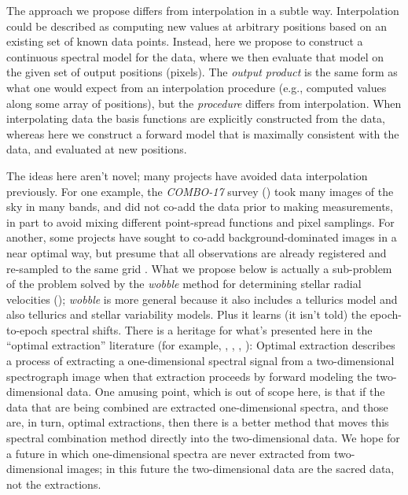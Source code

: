 \documentclass[modern]{aastex631}
\begin{document}

The approach we propose differs from interpolation in a subtle way. 
Interpolation could be described as computing new values at arbitrary positions based on an existing set of known data points. 
Instead, here we propose to construct a continuous spectral model for the data, where we then evaluate that model on the given set of output positions (pixels).
The \emph{output product} is the same form as what one would expect from an interpolation procedure (e.g., computed values along some array of positions), but the \emph{procedure} differs from interpolation. When interpolating data the basis functions are explicitly constructed from the data, whereas here we construct a forward model that is maximally consistent with the data, and evaluated at new positions.

The ideas here aren't novel; many projects have avoided data interpolation previously.
For one example, the \textsl{COMBO-17} survey (\citealt{combo17}) took many images of the sky in many bands, and did not co-add the data prior to making measurements, in part to avoid mixing different point-spread functions and pixel samplings.
For another, some projects have sought to co-add background-dominated images in a near optimal way, but presume that all observations are already registered and re-sampled to the same grid \citep{zackay}.
What we propose below is actually a sub-problem of the problem solved by the \textsl{wobble} method for determining stellar radial velocities (\citealt{wobble}); \textsl{wobble} is more general because it also includes a tellurics model and also tellurics and stellar variability models.
Plus it learns (it isn't told) the epoch-to-epoch spectral shifts.
There is a heritage for what's presented here in the ``optimal extraction'' literature (for example, \citealt{oe}, \citealt{kelson}, \citealt{froe}, \citealt{sp}):
Optimal extraction describes a process of extracting a one-dimensional spectral signal from a two-dimensional spectrograph image when that extraction proceeds by forward modeling the two-dimensional data.
One amusing point, which is out of scope here, is that if the data that are being combined are extracted one-dimensional spectra, and those are, in turn, optimal extractions, then there is a better method that moves this spectral combination method directly into the two-dimensional data.
We hope for a future in which one-dimensional spectra are never extracted from two-dimensional images; in this future the two-dimensional data are the sacred data, not the extractions.
\end{document}
